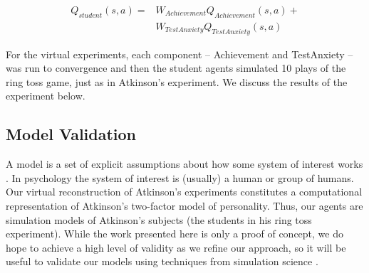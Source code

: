\begin{align}
Q_{student}(s,a) =  & W_{Achievement} Q_{Achievement}(s,a) +\\
                   & W_{TestAnxiety} Q_{TestAnxiety}(s,a)
\end{align}

For the virtual experiments, each component -- Achievement and TestAnxiety -- was run to convergence and then the student agents simulated 10 plays of the ring toss game, just as in Atkinson's experiment.  We discuss the results of the experiment below.

\subsection{Model Validation}






A model is a set of explicit assumptions about how some system of interest works \cite{law2007simulation}.  In psychology the system of interest is (usually) a human or group of humans.  Our virtual reconstruction of Atkinson's experiments constitutes a computational representation of Atkinson's two-factor model of personality.  Thus, our agents are simulation models of Atkinson's subjects (the students in his ring toss experiment).  While the work presented here is only a proof of concept, we do hope to achieve a high level of validity as we refine our approach, so it will be useful to validate our models using techniques from simulation science \cite{law2007simulation}.

